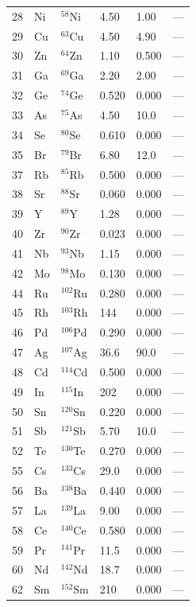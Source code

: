 \documentclass[11pt,a4paper]{article}
\begin{document}
\begin{otherlanguage}{arabic}
\begin{longtable}{p{0.8cm}p{1.2cm}p{2.0cm}p{2.5cm}p{2.5cm}p{2.5cm}}
			28 & Ni & \(^{58}\)Ni & 4.50 & 1.00 & --- \\
			29 & Cu & \(^{63}\)Cu & 4.50 & 4.90 & --- \\
			30 & Zn & \(^{64}\)Zn & 1.10 & 0.500 & --- \\
			31 & Ga & \(^{69}\)Ga & 2.20 & 2.00 & --- \\
			32 & Ge & \(^{74}\)Ge & 0.520 & 0.000 & --- \\
			33 & As & \(^{75}\)As & 4.50 & 10.0 & --- \\
			34 & Se & \(^{80}\)Se & 0.610 & 0.000 & --- \\
			35 & Br & \(^{79}\)Br & 6.80 & 12.0 & --- \\
			37 & Rb & \(^{85}\)Rb & 0.500 & 0.000 & --- \\
			38 & Sr & \(^{88}\)Sr & 0.060 & 0.000 & --- \\
			39 & Y  & \(^{89}\)Y & 1.28 & 0.000 & --- \\
			40 & Zr & \(^{90}\)Zr & 0.023 & 0.000 & --- \\
			41 & Nb & \(^{93}\)Nb & 1.15 & 0.000 & --- \\
			42 & Mo & \(^{98}\)Mo & 0.130 & 0.000 & --- \\
			44 & Ru & \(^{102}\)Ru & 0.280 & 0.000 & --- \\
			45 & Rh & \(^{103}\)Rh & 144 & 0.000 & --- \\
			46 & Pd & \(^{106}\)Pd & 0.290 & 0.000 & --- \\
			47 & Ag & \(^{107}\)Ag & 36.6 & 90.0 & --- \\
			48 & Cd & \(^{114}\)Cd & 0.500 & 0.000 & --- \\
			49 & In & \(^{115}\)In & 202 & 0.000 & --- \\
			50 & Sn & \(^{120}\)Sn & 0.220 & 0.000 & --- \\
			51 & Sb & \(^{121}\)Sb & 5.70 & 10.0 & --- \\
			52 & Te & \(^{130}\)Te & 0.270 & 0.000 & --- \\
			55 & Cs & \(^{133}\)Cs & 29.0 & 0.000 & --- \\
			56 & Ba & \(^{138}\)Ba & 0.440 & 0.000 & --- \\
			57 & La & \(^{139}\)La & 9.00 & 0.000 & --- \\
			58 & Ce & \(^{140}\)Ce & 0.580 & 0.000 & --- \\
			59 & Pr & \(^{141}\)Pr & 11.5 & 0.000 & --- \\
			60 & Nd & \(^{142}\)Nd & 18.7 & 0.000 & --- \\
			62 & Sm & \(^{152}\)Sm & 210 & 0.000 & --- \\

\end{longtable}
\end{otherlanguage}
\end{document}

